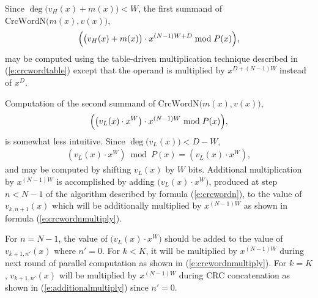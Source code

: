 \documentclass{article}
\begin{document}
Since $\deg\bigl(v_H(x)+m(x)\bigr) < W$, the first summand of
  $\mbox{CrcWordN}\bigl(m(x), v(x)\bigr)$,
\begin{align*}
  \Bigl(\bigl(v_H(x) + m(x)\bigr) \cdot x^{(N-1)W + D} \bmod P(x)\Bigr),
\end{align*}
may be computed using the table-driven multiplication technique described
in (\ref{e:crcwordtable}) except that the operand is multiplied by
$x^{D+(N-1)W}$ instead of $x^D$.

Computation of the second summand of $\mbox{CrcWordN}\bigl(m(x), v(x)\bigr)$,
  \begin{align*}
    \Bigl(\bigl(v_L(x) \cdot x^W \bigr) \cdot x^{(N-1)W} \bmod P(x)\Bigr),
  \end{align*}
is somewhat less intuitive. Since $\deg\bigl(v_L(x)\bigr) < D-W$,
  \begin{align*}
    \left(v_L(x) \cdot x^W\right) \bmod P(x) = \left(v_L(x) \cdot x^W\right),
  \end{align*}
and may be computed by shifting $v_L(x)$ by $W$ bits. Additional
multiplication by $x^{(N-1)W}$ is accomplished by adding $\bigl(v_L(x)
\cdot x^W\bigr)$, produced at step $n < N-1$ of the algorithm described by
formula (\ref{e:crcwordn}), to the value of $v_{k, n+1}(x)$ which will be
additionally multiplied by $x^{(N-1)W}$ as shown in formula
(\ref{e:crcwordnmultiply}).

For $n=N-1$, the value of $\bigl(v_L(x) \cdot x^W\bigr)$ should be added to
the value of $v_{k+1, n'}(x)$ where $n' = 0$. For $k < K$, it will be
multiplied by $x^{(N-1)W}$ during next round of parallel computation as
shown in (\ref{e:crcwordnmultiply}). For $k = K$, $v_{k+1, n'}(x)$ will be
multiplied by $x^{(N-1)W}$ during CRC concatenation as shown in
(\ref{e:additionalmultiply}) since $n'=0$.
\end{document}
